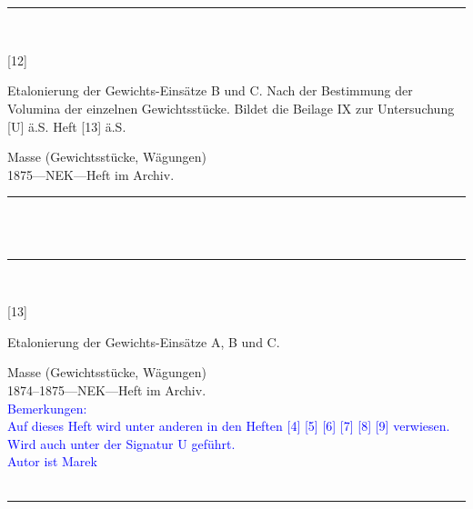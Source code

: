 \\
\vspace*{-2.5pt}\\
\parbox{\textwidth}{%
\rule{\textwidth}{1pt}\vspace*{-3mm}\\
\begin{minipage}[t]{0.15\textwidth}\vspace{0pt}
\Huge\rule[-4mm]{0cm}{1cm}[12]
\end{minipage}
\hfill
\begin{minipage}[t]{0.85\textwidth}\vspace{0pt}
\large Etalonierung der Gewichts-Einsätze B und C. Nach der Bestimmung der Volumina der einzelnen Gewichtsstücke. Bildet die Beilage IX zur Untersuchung [U] ä.S. Heft [13] ä.S.\rule[-2mm]{0mm}{2mm}
\end{minipage}
{\footnotesize\flushright
Masse (Gewichtsstücke, Wägungen)\\
}
1875\quad---\quad NEK\quad---\quad Heft im Archiv.\\
\rule{\textwidth}{1pt}
}
\\
\vspace*{-2.5pt}\\
\parbox{\textwidth}{%
\rule{\textwidth}{1pt}\vspace*{-3mm}\\
\begin{minipage}[t]{0.15\textwidth}\vspace{0pt}
\Huge\rule[-4mm]{0cm}{1cm}[13]
\end{minipage}
\hfill
\begin{minipage}[t]{0.85\textwidth}\vspace{0pt}
\large Etalonierung der Gewichts-Einsätze A, B und C.\rule[-2mm]{0mm}{2mm}
\end{minipage}
{\footnotesize\flushright
Masse (Gewichtsstücke, Wägungen)\\
}
1874--1875\quad---\quad NEK\quad---\quad Heft im Archiv.\\
\textcolor{blue}{Bemerkungen:\\{}
Auf dieses Heft wird unter anderen in den Heften [4] [5] [6] [7] [8] [9] verwiesen.\\{}
Wird auch unter der Signatur U geführt.\\{}
Autor ist Marek\\{}
}
\\[-15pt]
\rule{\textwidth}{1pt}
}
